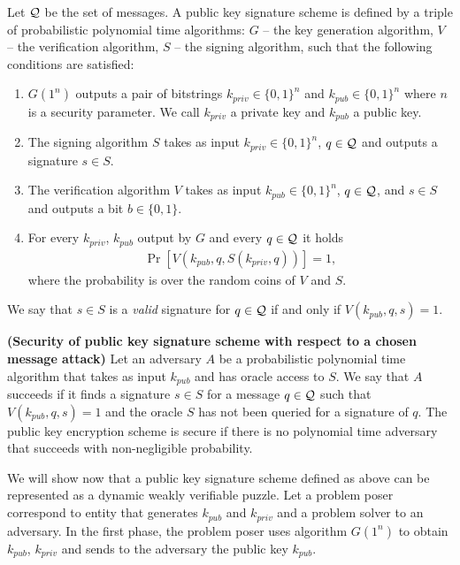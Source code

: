 \begin{definition}
Let $\mathcal{Q}$ be the set of messages. A \textnormal{public key signature scheme} is defined by a triple of probabilistic polynomial time algorithms:
$G$ -- the key generation algorithm,
$V$ -- the verification algorithm,
$S$ -- the signing algorithm,
such that the following conditions are satisfied:
\begin{enumerate}[-]
  \item $G(1^n)$ outputs a pair of bitstrings $k_{priv} \in \{0,1\}^{n}$ and $k_{pub} \in \{0,1\}^{n}$ where $n$ is a security parameter.
    We call $k_{priv}$ a private key and $k_{pub}$ a public key.
  \item The signing algorithm $S$ takes as input $k_{priv} \in \{0,1\}^{n}$, $q \in \mathcal{Q}$ and outputs a signature $s \in S$.
  \item The verification algorithm $V$ takes as input $k_{pub} \in \{0,1\}^{n}$, $q \in \mathcal{Q}$, and $s \in S$ and outputs a bit $b \in \{0,1\}$.
  \item For every $k_{priv}$, $k_{pub}$ output by $G$ and every $q \in \mathcal{Q}$ it holds
    \begin{align*}
      \Pr[V(k_{pub}, q, S(k_{priv}, q))] = 1,
    \end{align*}
    where the probability is over the random coins of $V$ and $S$.
\end{enumerate}
\end{definition}
We say that $s \in S$ is a \textit{valid} signature for $q \in \mathcal{Q}$ if and only if $V(k_{pub}, q, s) = 1$.
%
%
\begin{definition}\textbf{(Security of public key signature scheme with respect to a chosen message attack)}
Let an \textnormal{adversary} $A$ be a probabilistic polynomial time algorithm that takes as input $k_{pub}$ and has oracle access to $S$.
We say that $A$ \textnormal{succeeds} if it finds a signature $s \in S$ for a message $q \in \mathcal{Q}$ such that $V(k_{pub}, q, s) = 1$
and the oracle $S$ has not been queried for a signature of $q$.
The public key encryption scheme is \textnormal{secure} if there is no polynomial time adversary that succeeds with non-negligible probability.
\end{definition}
%
We will show now that a public key signature scheme defined as above can be represented as a dynamic weakly verifiable puzzle.
Let a problem poser correspond to entity that generates $k_{pub}$ and $k_{priv}$ and a problem solver to an adversary.
In the first phase, the problem poser uses algorithm $G(1^n)$ to obtain $k_{pub}$, $k_{priv}$ and sends to the adversary the public key $k_{pub}$.
